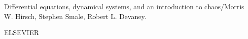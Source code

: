 Differential equations, dynamical systems, and an introduction to chaos/Morris W.
Hirsch, Stephen Smale, Robert L. Devaney.

ELSEVIER


